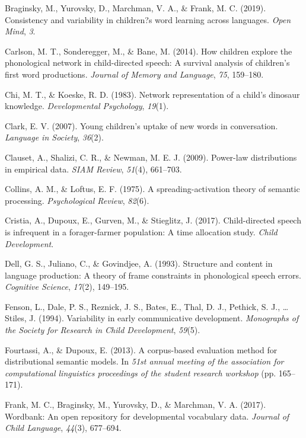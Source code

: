 \documentclass[english,floatsintext,man]{apa6}
\theoremstyle{definition}
\theoremstyle{definition}
\theoremstyle{definition}
\theoremstyle{remark}
\begin{document}
\hypertarget{ref-braginsky2019}{}
Braginsky, M., Yurovsky, D., Marchman, V. A., \& Frank, M. C. (2019).
Consistency and variability in children?s word learning across
languages. \emph{Open Mind}, \emph{3}.

\hypertarget{ref-carlson2014}{}
Carlson, M. T., Sonderegger, M., \& Bane, M. (2014). How children
explore the phonological network in child-directed speech: A survival
analysis of children's first word productions. \emph{Journal of Memory
and Language}, \emph{75}, 159--180.

\hypertarget{ref-chi1983}{}
Chi, M. T., \& Koeske, R. D. (1983). Network representation of a child's
dinosaur knowledge. \emph{Developmental Psychology}, \emph{19}(1).

\hypertarget{ref-clark2007}{}
Clark, E. V. (2007). Young children's uptake of new words in
conversation. \emph{Language in Society}, \emph{36}(2).

\hypertarget{ref-clauset09}{}
Clauset, A., Shalizi, C. R., \& Newman, M. E. J. (2009). Power-law
distributions in empirical data. \emph{SIAM Review}, \emph{51}(4),
661--703.

\hypertarget{ref-collins1975}{}
Collins, A. M., \& Loftus, E. F. (1975). A spreading-activation theory
of semantic processing. \emph{Psychological Review}, \emph{82}(6).

\hypertarget{ref-cristia2017}{}
Cristia, A., Dupoux, E., Gurven, M., \& Stieglitz, J. (2017).
Child-directed speech is infrequent in a forager-farmer population: A
time allocation study. \emph{Child Development}.

\hypertarget{ref-dell1993}{}
Dell, G. S., Juliano, C., \& Govindjee, A. (1993). Structure and content
in language production: A theory of frame constraints in phonological
speech errors. \emph{Cognitive Science}, \emph{17}(2), 149--195.

\hypertarget{ref-fenson94}{}
Fenson, L., Dale, P. S., Reznick, J. S., Bates, E., Thal, D. J.,
Pethick, S. J., \ldots{} Stiles, J. (1994). Variability in early
communicative development. \emph{Monographs of the Society for Research
in Child Development}, \emph{59}(5).

\hypertarget{ref-fourtassi2013}{}
Fourtassi, A., \& Dupoux, E. (2013). A corpus-based evaluation method
for distributional semantic models. In \emph{51st annual meeting of the
association for computational linguistics proceedings of the student
research workshop} (pp. 165--171).

\hypertarget{ref-frank2017}{}
Frank, M. C., Braginsky, M., Yurovsky, D., \& Marchman, V. A. (2017).
Wordbank: An open repository for developmental vocabulary data.
\emph{Journal of Child Language}, \emph{44}(3), 677--694.
\end{document}
